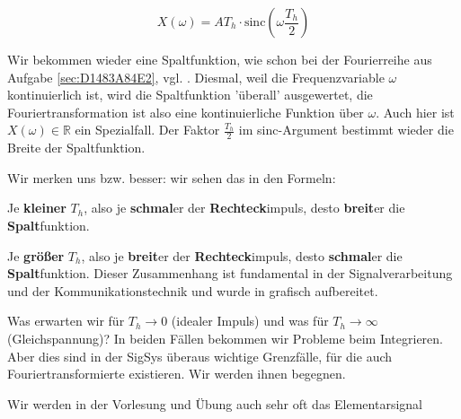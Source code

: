 \begin{Loesung}
\begin{equation}
\label{eq:8C3958BE4F_Loesung}
X(\omega) = A T_h \cdot \mathrm{sinc}(\omega \frac{T_h}{2})
\end{equation}

Wir bekommen wieder eine Spaltfunktion, wie schon bei der Fourierreihe aus Aufgabe
\ref{sec:D1483A84E2}, vgl. .
%
Diesmal, weil die Frequenzvariable $\omega$ kontinuierlich ist,
wird die Spaltfunktion 'überall' ausgewertet,
die Fouriertransformation ist also eine kontinuierliche Funktion über $\omega$.
%
Auch hier ist $X(\omega)\in\mathbb{R}$ ein Spezialfall.
%
Der Faktor $\frac{T_h}{2}$ im sinc-Argument bestimmt wieder die Breite der
Spaltfunktion.

Wir merken uns bzw. besser: wir sehen das in den Formeln:

Je \textbf{kleiner} $T_h$, also je \textbf{schmal}er der
\textbf{Rechteck}impuls, desto \textbf{breit}er die \textbf{Spalt}funktion.

Je \textbf{größer} $T_h$, also je \textbf{breit}er der
\textbf{Rechteck}impuls, desto \textbf{schmal}er die \textbf{Spalt}funktion.
%
Dieser Zusammenhang ist fundamental in der Signalverarbeitung und der
Kommunikationstechnik und wurde in  grafisch aufbereitet.

Was erwarten wir für $T_h\to 0$ (idealer Impuls) und was für $T_h\to \infty$
(Gleichspannung)? In beiden Fällen bekommen
wir Probleme beim Integrieren. Aber dies sind in der SigSys überaus wichtige
Grenzfälle, für die auch Fouriertransformierte existieren. Wir werden ihnen begegnen.

Wir werden in der Vorlesung und Übung auch sehr oft das Elementarsignal


\end{Loesung}
